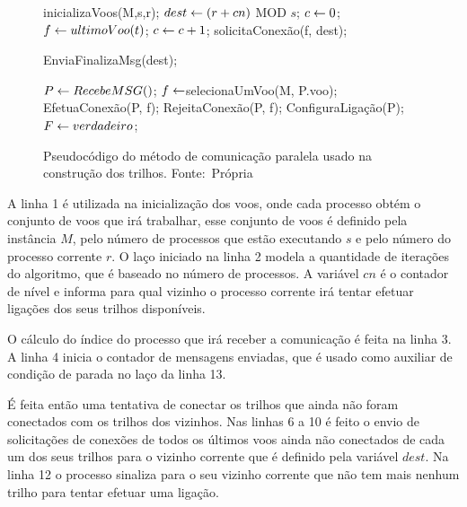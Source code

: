 \begin{figure}[h]
\caption{Pseudocódigo do método de comunicação paralela usado na construção dos
trilhos.
\newline
\mbox{Fonte: Própria}}\label{alg:metodoparalel}
\begin{programma}

\STATE inicializaVoos(M,s,r);
\STATE $dest \leftarrow (r + cn)$ MOD $s$;
\STATE $c \leftarrow 0$;
\STATE $f \leftarrow ultimoVoo(t)$;
	\STATE $c \leftarrow c + 1$;
	\STATE solicitaConexão(f, dest);
	\ENDIF
\ENDFOR

\STATE EnviaFinalizaMsg(dest);

	\STATE $P \leftarrow RecebeMSG()$;
		\STATE $f \leftarrow $selecionaUmVoo(M, P.voo);
			\STATE EfetuaConexão(P, f);
		\ELSE
			\STATE RejeitaConexão(P, f);
		\ENDIF
		\STATE ConfiguraLigação(P);
		\STATE $F \leftarrow verdadeiro$;
	\ENDIF 
	
\ENDWHILE
\ENDFOR

\ENDALGORITHM
\end{programma}
\end{figure} 


A linha 1 é utilizada na inicialização dos voos, onde cada processo obtém o
conjunto de voos que irá trabalhar, esse conjunto de voos é definido pela
instância $M$, pelo número de processos que estão executando $s$ e pelo número
do processo corrente $r$. O laço iniciado na linha 2 modela a quantidade de
iterações do algoritmo, que é baseado no número de processos. A variável $cn$ é
o contador de nível e informa para qual vizinho o processo corrente irá tentar
efetuar ligações dos seus trilhos disponíveis.

O cálculo do índice do processo que irá receber a comunicação é feita na linha
3. A linha 4 inicia o contador de mensagens enviadas, que é usado como auxiliar
de condição de parada no laço da linha 13.

É feita então uma tentativa de conectar os trilhos que ainda não
foram conectados com os trilhos dos vizinhos. Nas linhas 6 a 10 é
feito o envio de solicitações de conexões de todos os últimos voos ainda não
conectados de cada um dos seus trilhos para o vizinho corrente que é definido
pela variável $dest$. Na linha 12 o processo sinaliza para o seu vizinho
corrente que não tem mais nenhum trilho para tentar efetuar uma ligação.

